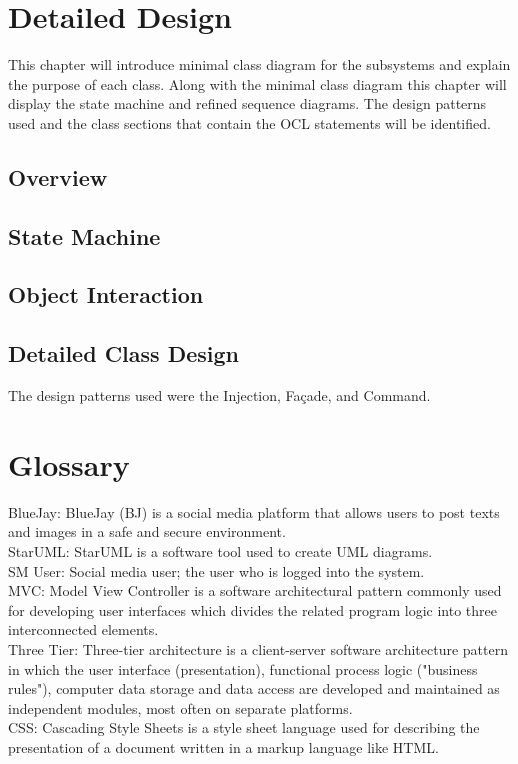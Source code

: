 \documentclass{report}
\begin{document}
\chapter{Detailed Design}
This chapter will introduce minimal class diagram for the subsystems and explain the purpose of each class. Along with the minimal class diagram this chapter will display the state machine and refined sequence diagrams. The design patterns used and the class sections that contain the OCL statements will be identified.\\
\section{Overview}
\section{State Machine}
\section{Object Interaction}
\section{Detailed Class Design}
The design patterns used were the Injection, Façade, and Command.


\chapter{Glossary}
BlueJay: BlueJay (BJ) is a social media platform that allows users to post texts and images in a safe and secure environment.\\
StarUML: StarUML is a software tool used to create UML diagrams.\\
SM User: Social media user; the user who is logged into the system.\\
MVC: Model View Controller is a software architectural pattern commonly used for developing user interfaces which divides the related program logic into three interconnected elements.\\
Three Tier: Three-tier architecture is a client-server software architecture pattern in which the user interface (presentation), functional process logic ("business rules"), computer data storage and data access are developed and maintained as independent modules, most often on separate platforms.\\
CSS: Cascading Style Sheets is a style sheet language used for describing the presentation of a document written in a markup language like HTML.\\
\end{document}
